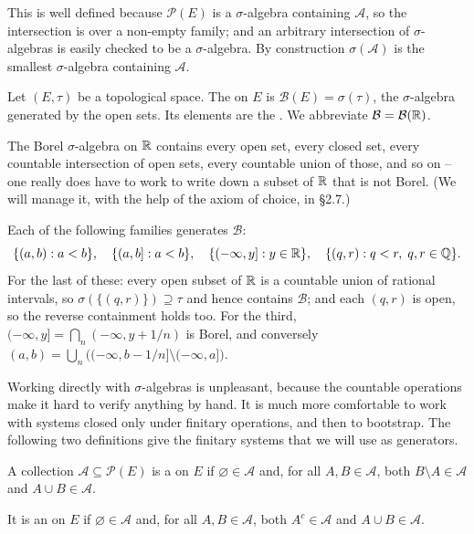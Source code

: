 \documentclass[a4paper]{scrartcl}
\newcommand{\cA}{\mathcal{A}}
\newcommand{\cB}{\mathcal{B}}
\begin{document}
This is well defined because $\mathcal{P}(E)$ is a $\sigma$-algebra containing $\cA$, so the intersection is over a non-empty family; and an arbitrary intersection of $\sigma$-algebras is easily checked to be a $\sigma$-algebra. By construction $\sigma(\cA)$ is the smallest $\sigma$-algebra containing $\cA$.

\begin{definition}
	Let $(E, \tau)$ be a topological space. The  on $E$ is $\cB(E) = \sigma(\tau)$, the $\sigma$-algebra generated by the open sets. Its elements are the . We abbreviate $\cB = \cB(\R)$.
\end{definition}

The Borel $\sigma$-algebra on $\mathbb{R}$ contains every open set, every closed set, every countable intersection of open sets, every countable union of those, and so on -- one really does have to work to write down a subset of $\mathbb{R}$ that is not Borel. (We will manage it, with the help of the axiom of choice, in \S2.7.)

\begin{example}[Generators of $\cB$]
	Each of the following families generates $\cB$:
	$$
	\{ (a,b) : a<b \}, \quad \{ (a, b] : a < b \}, \quad \{ (-\infty, y] : y \in \mathbb{R} \}, \quad \{ (q, r) : q < r,\; q,r \in \mathbb{Q} \}.
	$$
	For the last of these: every open subset of $\mathbb{R}$ is a countable union of rational intervals, so $\sigma(\{(q,r)\}) \supseteq \tau$ and hence contains $\cB$; and each $(q,r)$ is open, so the reverse containment holds too. For the third, $(-\infty, y] = \bigcap_n (-\infty, y + 1/n)$ is Borel, and conversely $(a,b) = \bigcup_n \big( (-\infty, b - 1/n] \setminus (-\infty, a] \big)$.
\end{example}

Working directly with $\sigma$-algebras is unpleasant, because the countable operations make it hard to verify anything by hand. It is much more comfortable to work with systems closed only under finitary operations, and then to bootstrap. The following two definitions give the finitary systems that we will use as generators.

\begin{definition}
	A collection $\cA \subseteq \mathcal{P}(E)$ is a  on $E$ if $\varnothing \in \cA$ and, for all $A, B \in \cA$, both $B \setminus A \in \cA$ and $A \cup B \in \cA$.

	It is an  on $E$ if $\varnothing \in \cA$ and, for all $A, B \in \cA$, both $A^c \in \cA$ and $A \cup B \in \cA$.
\end{definition}
\end{document}
